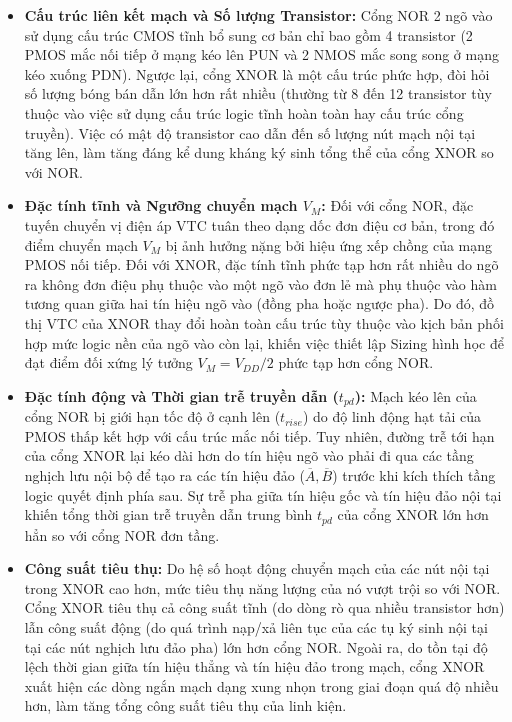 \documentclass[12pt, a4paper, oneside]{article}
\begin{document}
\begin{itemize}
    \item \textbf{Cấu trúc liên kết mạch và Số lượng Transistor:} 
    Cổng NOR 2 ngõ vào sử dụng cấu trúc CMOS tĩnh bổ sung cơ bản chỉ bao gồm 4 transistor (2 PMOS mắc nối tiếp ở mạng kéo lên PUN và 2 NMOS mắc song song ở mạng kéo xuống PDN). Ngược lại, cổng XNOR là một cấu trúc phức hợp, đòi hỏi số lượng bóng bán dẫn lớn hơn rất nhiều (thường từ 8 đến 12 transistor tùy thuộc vào việc sử dụng cấu trúc logic tĩnh hoàn toàn hay cấu trúc cổng truyền). Việc có mật độ transistor cao dẫn đến số lượng nút mạch nội tại tăng lên, làm tăng đáng kể dung kháng ký sinh tổng thể của cổng XNOR so với NOR.
    
    \item \textbf{Đặc tính tĩnh và Ngưỡng chuyển mạch $V_M$:} 
    Đối với cổng NOR, đặc tuyến chuyển vị điện áp VTC tuân theo dạng dốc đơn điệu cơ bản, trong đó điểm chuyển mạch $V_M$ bị ảnh hưởng nặng bởi hiệu ứng xếp chồng của mạng PMOS nối tiếp. Đối với XNOR, đặc tính tĩnh phức tạp hơn rất nhiều do ngõ ra không đơn điệu phụ thuộc vào một ngõ vào đơn lẻ mà phụ thuộc vào hàm tương quan giữa hai tín hiệu ngõ vào (đồng pha hoặc ngược pha). Do đó, đồ thị VTC của XNOR thay đổi hoàn toàn cấu trúc tùy thuộc vào kịch bản phối hợp mức logic nền của ngõ vào còn lại, khiến việc thiết lập Sizing hình học để đạt điểm đối xứng lý tưởng $V_M = V_{DD}/2$ phức tạp hơn cổng NOR.
    
    \item \textbf{Đặc tính động và Thời gian trễ truyền dẫn ($t_{pd}$):} 
    Mạch kéo lên của cổng NOR bị giới hạn tốc độ ở cạnh lên ($t_{rise}$) do độ linh động hạt tải của PMOS thấp kết hợp với cấu trúc mắc nối tiếp. Tuy nhiên, đường trễ tới hạn của cổng XNOR lại kéo dài hơn do tín hiệu ngõ vào phải đi qua các tầng nghịch lưu nội bộ để tạo ra các tín hiệu đảo ($\overline{A}, \overline{B}$) trước khi kích thích tầng logic quyết định phía sau. Sự trễ pha giữa tín hiệu gốc và tín hiệu đảo nội tại khiến tổng thời gian trễ truyền dẫn trung bình $t_{pd}$ của cổng XNOR lớn hơn hẳn so với cổng NOR đơn tầng.
    
    \item \textbf{Công suất tiêu thụ:} 
    Do hệ số hoạt động chuyển mạch của các nút nội tại trong XNOR cao hơn, mức tiêu thụ năng lượng của nó vượt trội so với NOR. Cổng XNOR tiêu thụ cả công suất tĩnh (do dòng rò qua nhiều transistor hơn) lẫn công suất động (do quá trình nạp/xả liên tục của các tụ ký sinh nội tại tại các nút nghịch lưu đảo pha) lớn hơn cổng NOR. Ngoài ra, do tồn tại độ lệch thời gian giữa tín hiệu thẳng và tín hiệu đảo trong mạch, cổng XNOR xuất hiện các dòng ngắn mạch dạng xung nhọn trong giai đoạn quá độ nhiều hơn, làm tăng tổng công suất tiêu thụ của linh kiện.
\end{itemize}
\end{document}
